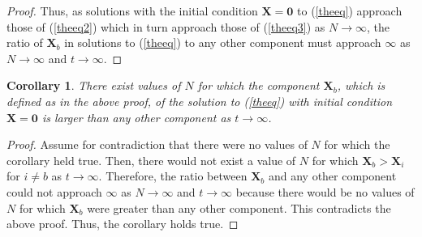 \documentclass{article}
\newtheorem{cor}{Corollary}
\begin{document}
\begin{proof}
  Thus, as solutions with the initial condition $\mathbf{X} = \mathbf{0}$ to (\ref{theeq}) approach those of (\ref{theeq2}) which in turn approach those of (\ref{theeq3}) as $N \rightarrow \infty$, the ratio of $\mathbf{X}_b$ in solutions to (\ref{theeq}) to any other component must approach $\infty$ as $N \rightarrow \infty$ and $t \rightarrow \infty$.

\end{proof}

\begin{cor}
  There exist values of $N$ for which the component $\mathbf{X}_b$, which is defined as in the above proof, of the solution to (\ref{theeq}) with initial condition $\mathbf{X} = \mathbf{0}$ is larger than any other component as $t \rightarrow \infty$.
\end{cor}
\begin{proof}
  Assume for contradiction that there were no values of $N$ for which the corollary held true. Then, there would not exist a value of $N$ for which $\mathbf{X}_b > \mathbf{X}_i$ for $i \ne b$ as $t \rightarrow \infty$. Therefore, the ratio between $\mathbf{X}_b$ and any other component could not approach $\infty$ as $N \rightarrow \infty$ and $t \rightarrow \infty$ because there would be no values of $N$ for which $\mathbf{X}_b$ were greater than any other component. This contradicts the above proof. Thus, the corollary holds true.
\end{proof}
\end{document}

